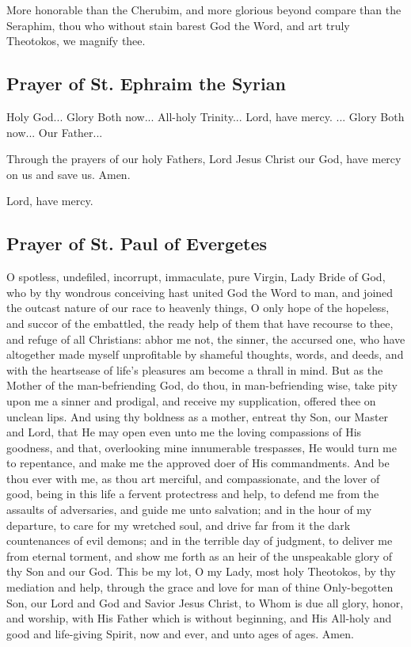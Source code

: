 More honorable than the Cherubim, and more glorious beyond compare than the Seraphim, thou who without stain barest God the Word, and art truly Theotokos, we magnify thee.

\subsection{Prayer of St. Ephraim the Syrian}




Holy God... Glory  Both now... All-holy Trinity... Lord, have mercy. ... Glory  Both now... Our Father...

Through the prayers of our holy Fathers, Lord Jesus Christ our God, have mercy on us and save us. Amen.


Lord, have mercy. 

\subsection{Prayer of St. Paul of Evergetes}

O spotless, undefiled, incorrupt, immaculate, pure Virgin, Lady Bride of God, who by thy wondrous conceiving hast united God the Word to man, and joined the outcast nature of our race to heavenly things, O only hope of the hopeless, and succor of the embattled, the ready help of them that have recourse to thee, and refuge of all Christians: abhor me not, the sinner, the accursed one, who have altogether made myself unprofitable by shameful thoughts, words, and deeds, and with the heartsease of life's pleasures am become a thrall in mind. But as the Mother of the man-befriending God, do thou, in man-befriending wise, take pity upon me a sinner and prodigal, and receive my supplication, offered thee on unclean lips. And using thy boldness as a mother, entreat thy Son, our Master and Lord, that He may open even unto me the loving compassions of His goodness, and that, overlooking mine innumerable trespasses, He would turn me to repentance, and make me the approved doer of His commandments. And be thou ever with me, as thou art merciful, and compassionate, and the lover of good, being in this life a fervent protectress and help, to defend me from the assaults of adversaries, and guide me unto salvation; and in the hour of my departure, to care for my wretched soul, and drive far from it the dark countenances of evil demons; and in the terrible day of judgment, to deliver me from eternal torment, and show me forth as an heir of the unspeakable glory of thy Son and our God. This be my lot, O my Lady, most holy Theotokos, by thy mediation and help, through the grace and love for man of thine Only-begotten Son, our Lord and God and Savior Jesus Christ, to Whom is due all glory, honor, and worship, with His Father which is without beginning, and His All-holy and good and life-giving Spirit, now and ever, and unto ages of ages. Amen.

